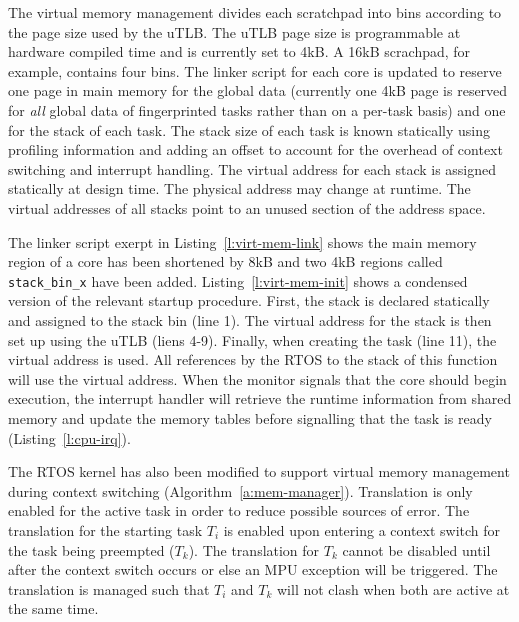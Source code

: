 	The virtual memory management divides each scratchpad into bins according to the page size used by the uTLB. 
	The uTLB page size is programmable at hardware compiled time and is currently set to 4kB. 
	A 16kB scrachpad, for example, contains four bins.  
	The linker script for each core is updated to reserve one page in main memory for the global data (currently one 4kB page is reserved for \emph{all} global data of fingerprinted tasks rather than on a per-task basis) and one for the stack of each task. 
	The stack size of each task is known statically using profiling information and adding an offset to account for the overhead of context switching and interrupt handling. 
	The virtual address for each stack is assigned statically at design time. 
	The physical address may change at runtime. 
	The virtual addresses of all stacks point to an unused section of the address space.

	The linker script exerpt in Listing~\ref{l:virt-mem-link} shows the main memory region of a core has been shortened by 8kB and two 4kB regions called \texttt{stack\_bin\_x} have been added. 
	Listing~\ref{l:virt-mem-init} shows a condensed version of the relevant startup procedure. 
	First, the stack is declared statically and assigned to the stack bin (line 1). 
	The virtual address for the stack is then set up using the uTLB (liens 4-9). 
	Finally, when creating the task (line 11), the virtual address is used. 
	All references by the RTOS to the stack of this function will use the virtual address. 
	When the monitor signals that the core should begin execution, the interrupt handler will retrieve the runtime information from shared memory and update the memory tables before signalling that the task is ready (Listing~\ref{l:cpu-irq}).



	The RTOS kernel has also been modified to support virtual memory management during context switching (Algorithm~\ref{a:mem-manager}). 
	Translation is only enabled for the active task in order to reduce possible sources of error. 
	The translation for the starting task $T_i$ is enabled upon entering a context switch for the task being preempted ($T_k$). 
	The translation for $T_k$ cannot be disabled until after the context switch occurs or else an MPU exception will be triggered. 
	The translation is managed such that $T_i$ and $T_k$ will not clash when both are active at the same time.


